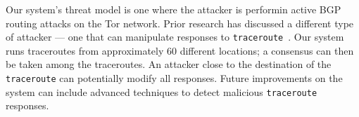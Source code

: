 Our system's threat model is one where the attacker is performin active BGP routing attacks on the Tor network.  Prior research has discussed a different type of attacker --- one that can manipulate responses to {\tt traceroute}~\cite{padmanabhan2003secure}.  Our system runs traceroutes from approximately 60 different locations; a consensus can then be taken among the traceroutes.  An attacker close to the destination of the {\tt traceroute} can potentially modify all responses.  Future improvements on the system can include advanced techniques to detect malicious {\tt traceroute} responses.


